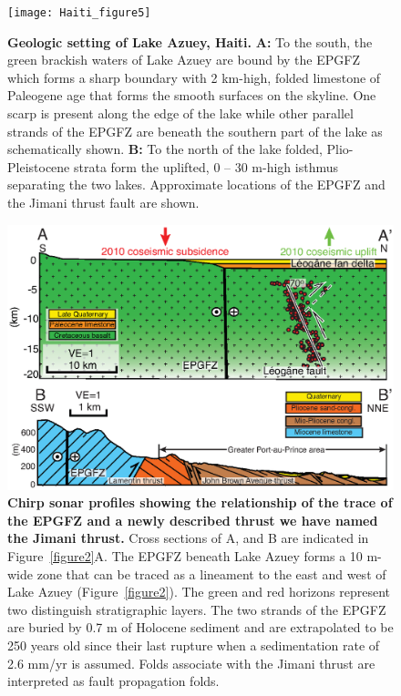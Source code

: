 \documentclass[linenumbers,draft]{agujournal}
\begin{document}
\begin{figure}
\centering
\texttt{[image: Haiti\_figure5]}
\caption{\textbf{Geologic setting of Lake Azuey, Haiti.} \textbf{A:} To the south, the green brackish waters of Lake Azuey are bound by the EPGFZ which forms a sharp boundary with 2 km-high, folded limestone of Paleogene age that forms the smooth surfaces on the skyline. One scarp is present along the edge of the lake while other parallel strands of the EPGFZ are beneath the southern part of the lake as schematically shown. \textbf{B:} To the north of the lake folded, Plio-Pleistocene strata form the uplifted, 0 -- 30 m-high isthmus separating the two lakes. Approximate locations of the EPGFZ and the Jimani thrust fault are shown.}
\label{figure5}
\end{figure}

\begin{figure}
\centering
\includegraphics[width=\textwidth]{Haiti_figure3}
\caption{\textbf{Chirp sonar profiles showing the relationship of the trace of the EPGFZ and a newly described thrust we have named the Jimani thrust.} Cross sections of A, and B are indicated in Figure~\ref{figure2}A. The EPGFZ beneath Lake Azuey forms a 10 m-wide zone that can be traced as a lineament to the east and west of Lake Azuey (Figure~\ref{figure2}). The green and red horizons represent two distinguish stratigraphic layers. The two strands of the EPGFZ are buried by 0.7 m of Holocene sediment and are extrapolated to be 250 years old since their last rupture when a sedimentation rate of 2.6 mm/yr is assumed.  Folds associate with the Jimani thrust are interpreted as fault propagation folds.}
\label{figure6}
\end{figure}
\end{document}
